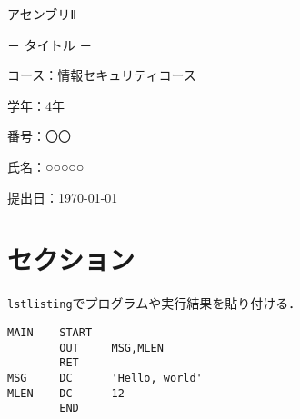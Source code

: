 \documentclass[uplatex]{jsarticle}
\newcommand{\vsc}{\vspace{5pt}}
\begin{document}
\begin{titlepage}
    \vspace*{15truept}

    \begin{center}

        {\Large アセンブリⅡ}

        \vspace{15truept}

        {\Large － タイトル －}

        \vspace{350truept}
    \end{center}

    \hspace{120truept}
    {\large コース：情報セキュリティコース}

    \vspace{10truept}

    \hspace{120truept}
    {\large 学年：4年}

    \vspace{10truept}

    \hspace{120truept}
    {\large 番号：〇〇}

    \vspace{10truept}

    \hspace{120truept}
    {\large 氏名：○○○○○}

    \vspace{10truept}

    \hspace{120truept}
    {\large 提出日：\today}

\end{titlepage}

\section{セクション}

\verb|lstlisting|でプログラムや実行結果を貼り付ける．

\vsc
\begin{lstlisting}
MAIN    START
        OUT     MSG,MLEN
        RET
MSG     DC      'Hello, world'
MLEN    DC      12
        END
\end{lstlisting}
\end{document}
